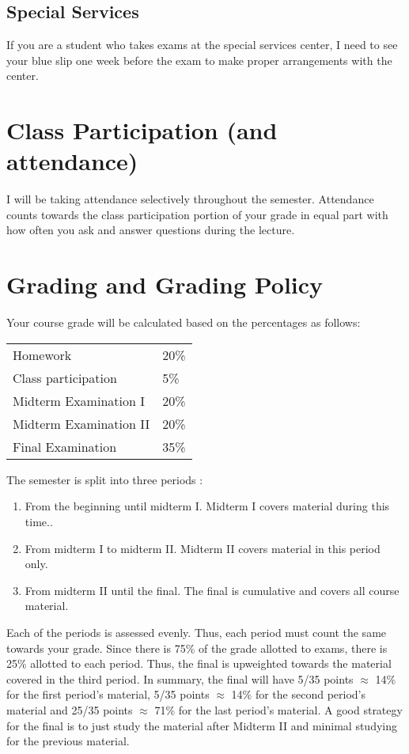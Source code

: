 \documentclass[12pt]{article}
\begin{document}
\subsection*{Special Services}

If you are a student who takes exams at the special services center, I need to see your blue slip one week before the exam to make proper arrangements with the center.

\section*{Class Participation (and attendance)}

I will be taking attendance selectively throughout the semester. Attendance counts towards the class participation portion of your grade in equal part with how often you ask and answer questions during the lecture.


\section*{Grading and Grading Policy}\label{sec:grading}

Your course grade will be calculated based on the percentages as follows: 

\begin{table}[h]
\centering
\begin{tabular}{l|l}
Homework & 20\% \\
Class participation & 5\% \\
Midterm Examination I & 20\%\\
Midterm Examination II & 20\%\\
Final Examination & 35\%
\end{tabular}
\end{table}
\FloatBarrier

The semester is split into three periods :

\begin{enumerate}
\item From the beginning until midterm I. Midterm I covers material during this time..
\item From midterm I to midterm II. Midterm II covers material in this period only. 
\item From midterm II until the final. The final is cumulative and covers all course material.
\end{enumerate}

Each of the periods is assessed evenly. Thus, each period must count the same towards your grade. Since there is 75\% of the grade allotted to exams, there is 25\% allotted to each period. Thus, the final is upweighted towards the material covered in the third period. In summary, the final will have 5/35 points $\approx$ 14\% for the first period's material, 5/35 points $\approx$ 14\% for the second period's material and 25/35 points $\approx$ 71\% for the last period's material. A good strategy for the final is to just study the material after Midterm II and minimal studying for the previous material.
\end{document}
